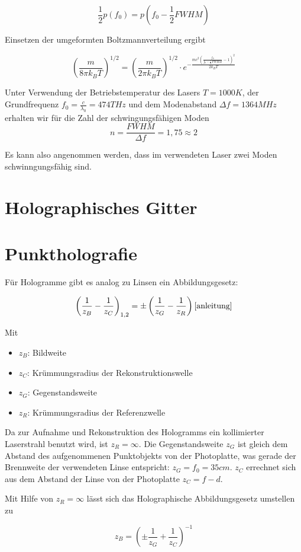\documentclass[bigchapter,colorback,accentcolor=tud4b,linedtoc,11pt]{tudreport}
\begin{document}
$$\frac{1}{2}p(f_0) = p(f_0 - \frac{1}{2} FWHM) $$

Einsetzen der umgeformten Boltzmannverteilung ergibt

$$\left(\frac{m}{8\pi k_B T}\right)^{1/2} = \left(\frac{m}{2\pi k_B
    T}\right)^{1/2} \cdot e^{-\frac{m c^2\left( \frac{f_0}{f_0 -
        \frac{1}{2}FWHM}-1 \right)^2}{2k_B T}}$$

Unter Verwendung der Betriebstemperatur des Lasers $T = 1000K$, der
Grundfrequenz $f_0 = \frac{c}{\lambda_0} = 474THz$ und dem Modenabstand $\Delta
f = 1364MHz$ erhalten wir für die Zahl der schwingungsfähigen Moden
$$n = \frac{FWHM}{\Delta f} = 1,75 \approx 2$$

Es kann also angenommen werden, dass im verwendeten Laser zwei Moden
schwinngungsfähig sind.


\section{Holographisches Gitter}

\section{Punktholografie}

Für Hologramme gibt es analog zu Linsen ein Abbildungsgesetz:

$$\left( \frac{1}{z_B} -\frac{1}{z_C} \right)_{1,2} = \pm \left( \frac{1}{z_G}
  -\frac{1}{z_R} \right) \cite{anleitung}$$

Mit 
\begin{itemize}
  \item $z_B$: Bildweite
  \item $z_C$: Krümmungsradius der Rekonstruktionswelle
  \item $z_G$: Gegenstandsweite
  \item $z_R$: Krümmungsradius der Referenzwelle
\end{itemize}
Da zur Aufnahme und Rekonstruktion des Hologramms ein kollimierter Laserstrahl
benutzt wird, ist $z_R = \infty$. Die Gegenstandsweite $z_G$ ist gleich dem
Abstand des aufgenommenen Punktobjekts von der Photoplatte, was gerade der
Brennweite der verwendeten Linse entspricht: $z_G = f_0 = 35cm$. $z_C$ errechnet
sich aus dem Abstand der Linse von der Photoplatte $z_C = f - d$.

Mit Hilfe von $z_R = \infty$ lässt sich das Holographische Abbildungsgesetz
umstellen zu 

$$z_B = \left(\pm\frac{1}{z_G}+\frac{1}{z_C}\right)^{-1}$$
\end{document}
